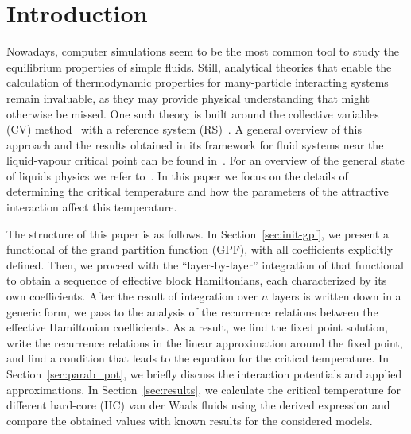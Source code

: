 \section{Introduction}

Nowadays, computer simulations seem to be the most common tool to study the equilibrium properties of simple fluids. Still, analytical theories that enable the calculation of thermodynamic properties for many-particle interacting systems remain invaluable, as they may provide physical understanding that might otherwise be missed. One such theory is built around the collective variables (CV) method~\cite{Yukh1980book} with a reference system (RS)~\cite{Yukh1990}. A general overview of this approach and the results obtained in its framework for fluid systems near the liquid-vapour critical point can be found in~\cite{Yukh2015En}. For an overview of the general state of liquids physics we refer to~\cite{hansen2013theory,adamBulavin2006book}. In this paper we focus on the details of determining the critical temperature and how the parameters of the attractive interaction affect this temperature. 

The structure of this paper is as follows. In Section~\ref{sec:init-gpf}, we present a functional of the grand partition function (GPF), with all coefficients explicitly defined. Then, we proceed with the ``layer-by-layer'' integration of that functional to obtain a sequence of effective block Hamiltonians, each characterized by its own coefficients. After the result of integration over $n$ layers is written down in a generic form, we pass to the analysis of the recurrence relations between the effective Hamiltonian coefficients. As a result, we find the fixed point solution, write the recurrence relations in the linear approximation around the fixed point, and find a condition that leads to the equation for the critical temperature. In Section~\ref{sec:parab_pot}, we briefly discuss the interaction potentials and applied approximations. In Section~\ref{sec:results}, we calculate the critical temperature for different hard-core (HC) van der Waals fluids using the derived expression and compare the obtained values with known results for the considered models.

